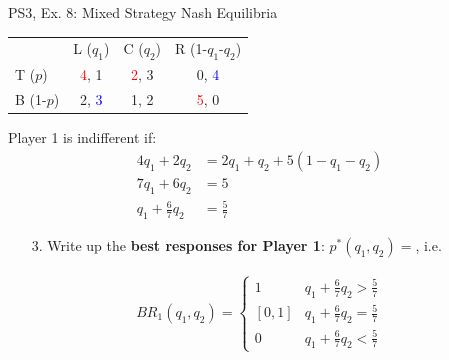 \begin{frame}{PS3, Ex. 8: Mixed Strategy Nash Equilibria}
  \begin{multicols}{2}
    \begin{table}
      \begin{tabular}{l|c|c|c|}
          \multicolumn{1}{c}{}  & \multicolumn{1}{c}{L ($q_1$)} & \multicolumn{1}{c}{C ($q_2$)} & \multicolumn{1}{c}{R (1-$q_1$-$q_2$)} \\\cline{2-4}
          T ($p$)   & \textcolor{red}{4}, 1 & \textcolor{red}{2}, 3 & 0, \textcolor{blue}{4} \\\cline{2-4}
          B (1-$p$) & 2, \textcolor{blue}{3} & 1, 2 & \textcolor{red}{5}, 0 \\\cline{2-4}
      \end{tabular}
    \end{table}
    Player 1 is indifferent if:
    \begin{align*}
      4q_1 + 2q_2 &= 2q_1 + q_2 + 5(1-q_1-q_2)\\
      7q_1 + 6q_2 &= 5 \\
      q_1 + \frac{6}{7}q_2 &= \frac{5}{7}
    \end{align*}
    \begin{itemize}
      \item[3.] Write up the \textbf{best responses for Player 1}: $p^{*}(q_1,q_2)=$, i.e.
    \end{itemize}
    \begin{align*}
      BR_1(q_1,q_2)=\left\{ \begin{array}{ll}
          1                 & q_1 + \frac{6}{7}q_2 > \frac{5}{7} \\
          \left[0,1\right]  & q_1 + \frac{6}{7}q_2 = \frac{5}{7} \\
          0                 & q_1 + \frac{6}{7}q_2 < \frac{5}{7}
      \end{array}\right.
    \end{align*}
  \vfill\null \columnbreak
  \vfill\null
  \end{multicols}
\end{frame}
